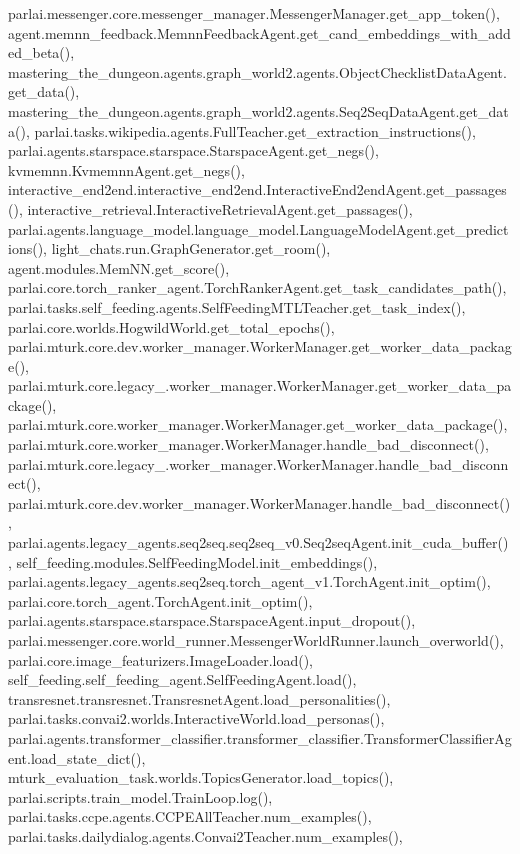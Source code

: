 parlai.\+messenger.\+core.\+messenger\+\_\+manager.\+Messenger\+Manager.\+get\+\_\+app\+\_\+token(), agent.\+memnn\+\_\+feedback.\+Memnn\+Feedback\+Agent.\+get\+\_\+cand\+\_\+embeddings\+\_\+with\+\_\+added\+\_\+beta(), mastering\+\_\+the\+\_\+dungeon.\+agents.\+graph\+\_\+world2.\+agents.\+Object\+Checklist\+Data\+Agent.\+get\+\_\+data(), mastering\+\_\+the\+\_\+dungeon.\+agents.\+graph\+\_\+world2.\+agents.\+Seq2\+Seq\+Data\+Agent.\+get\+\_\+data(), parlai.\+tasks.\+wikipedia.\+agents.\+Full\+Teacher.\+get\+\_\+extraction\+\_\+instructions(), parlai.\+agents.\+starspace.\+starspace.\+Starspace\+Agent.\+get\+\_\+negs(), kvmemnn.\+Kvmemnn\+Agent.\+get\+\_\+negs(), interactive\+\_\+end2end.\+interactive\+\_\+end2end.\+Interactive\+End2end\+Agent.\+get\+\_\+passages(), interactive\+\_\+retrieval.\+Interactive\+Retrieval\+Agent.\+get\+\_\+passages(), parlai.\+agents.\+language\+\_\+model.\+language\+\_\+model.\+Language\+Model\+Agent.\+get\+\_\+predictions(), light\+\_\+chats.\+run.\+Graph\+Generator.\+get\+\_\+room(), agent.\+modules.\+Mem\+N\+N.\+get\+\_\+score(), parlai.\+core.\+torch\+\_\+ranker\+\_\+agent.\+Torch\+Ranker\+Agent.\+get\+\_\+task\+\_\+candidates\+\_\+path(), parlai.\+tasks.\+self\+\_\+feeding.\+agents.\+Self\+Feeding\+M\+T\+L\+Teacher.\+get\+\_\+task\+\_\+index(), parlai.\+core.\+worlds.\+Hogwild\+World.\+get\+\_\+total\+\_\+epochs(), parlai.\+mturk.\+core.\+dev.\+worker\+\_\+manager.\+Worker\+Manager.\+get\+\_\+worker\+\_\+data\+\_\+package(), parlai.\+mturk.\+core.\+legacy\+\_.\+worker\+\_\+manager.\+Worker\+Manager.\+get\+\_\+worker\+\_\+data\+\_\+package(), parlai.\+mturk.\+core.\+worker\+\_\+manager.\+Worker\+Manager.\+get\+\_\+worker\+\_\+data\+\_\+package(), parlai.\+mturk.\+core.\+worker\+\_\+manager.\+Worker\+Manager.\+handle\+\_\+bad\+\_\+disconnect(), parlai.\+mturk.\+core.\+legacy\+\_.\+worker\+\_\+manager.\+Worker\+Manager.\+handle\+\_\+bad\+\_\+disconnect(), parlai.\+mturk.\+core.\+dev.\+worker\+\_\+manager.\+Worker\+Manager.\+handle\+\_\+bad\+\_\+disconnect(), parlai.\+agents.\+legacy\+\_\+agents.\+seq2seq.\+seq2seq\+\_\+v0.\+Seq2seq\+Agent.\+init\+\_\+cuda\+\_\+buffer(), self\+\_\+feeding.\+modules.\+Self\+Feeding\+Model.\+init\+\_\+embeddings(), parlai.\+agents.\+legacy\+\_\+agents.\+seq2seq.\+torch\+\_\+agent\+\_\+v1.\+Torch\+Agent.\+init\+\_\+optim(), parlai.\+core.\+torch\+\_\+agent.\+Torch\+Agent.\+init\+\_\+optim(), parlai.\+agents.\+starspace.\+starspace.\+Starspace\+Agent.\+input\+\_\+dropout(), parlai.\+messenger.\+core.\+world\+\_\+runner.\+Messenger\+World\+Runner.\+launch\+\_\+overworld(), parlai.\+core.\+image\+\_\+featurizers.\+Image\+Loader.\+load(), self\+\_\+feeding.\+self\+\_\+feeding\+\_\+agent.\+Self\+Feeding\+Agent.\+load(), transresnet.\+transresnet.\+Transresnet\+Agent.\+load\+\_\+personalities(), parlai.\+tasks.\+convai2.\+worlds.\+Interactive\+World.\+load\+\_\+personas(), parlai.\+agents.\+transformer\+\_\+classifier.\+transformer\+\_\+classifier.\+Transformer\+Classifier\+Agent.\+load\+\_\+state\+\_\+dict(), mturk\+\_\+evaluation\+\_\+task.\+worlds.\+Topics\+Generator.\+load\+\_\+topics(), parlai.\+scripts.\+train\+\_\+model.\+Train\+Loop.\+log(), parlai.\+tasks.\+ccpe.\+agents.\+C\+C\+P\+E\+All\+Teacher.\+num\+\_\+examples(), parlai.\+tasks.\+dailydialog.\+agents.\+Convai2\+Teacher.\+num\+\_\+examples(), 